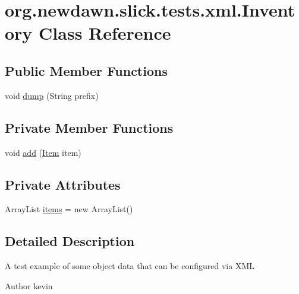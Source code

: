 \hypertarget{classorg_1_1newdawn_1_1slick_1_1tests_1_1xml_1_1_inventory}{}\section{org.\+newdawn.\+slick.\+tests.\+xml.\+Inventory Class Reference}
\label{classorg_1_1newdawn_1_1slick_1_1tests_1_1xml_1_1_inventory}
\subsection*{Public Member Functions}
\begin{DoxyCompactItemize}
\item 
void \mbox{\hyperlink{classorg_1_1newdawn_1_1slick_1_1tests_1_1xml_1_1_inventory_ae6476f32141f6791d3b69cc9687fae4a}{dump}} (String prefix)
\end{DoxyCompactItemize}
\subsection*{Private Member Functions}
\begin{DoxyCompactItemize}
\item 
void \mbox{\hyperlink{classorg_1_1newdawn_1_1slick_1_1tests_1_1xml_1_1_inventory_a900aaad5d0e18480d365397a8579e3a3}{add}} (\mbox{\hyperlink{classorg_1_1newdawn_1_1slick_1_1tests_1_1xml_1_1_item}{Item}} item)
\end{DoxyCompactItemize}
\subsection*{Private Attributes}
\begin{DoxyCompactItemize}
\item 
Array\+List \mbox{\hyperlink{classorg_1_1newdawn_1_1slick_1_1tests_1_1xml_1_1_inventory_a2bfc94164f1557cee534126a6c27e690}{items}} = new Array\+List()
\end{DoxyCompactItemize}


\subsection{Detailed Description}
A test example of some object data that can be configured via X\+ML

\begin{DoxyAuthor}{Author}
kevin 
\end{DoxyAuthor}


